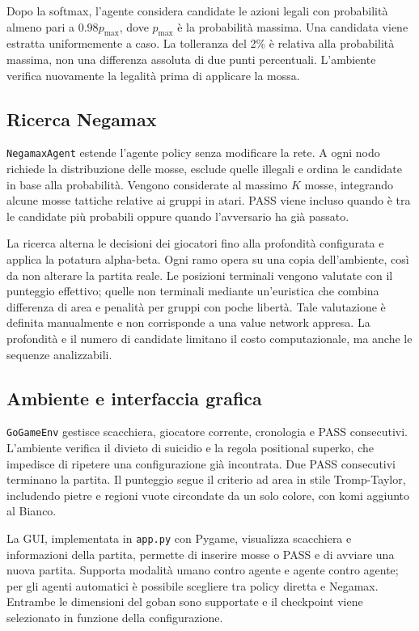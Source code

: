 Dopo la softmax, l'agente considera candidate le azioni legali con probabilità almeno pari a $0.98p_{\max}$, dove $p_{\max}$ è la probabilità massima. Una candidata viene estratta uniformemente a caso. La tolleranza del 2\% è relativa alla probabilità massima, non una differenza assoluta di due punti percentuali. L'ambiente verifica nuovamente la legalità prima di applicare la mossa.

\subsection{Ricerca Negamax}

\texttt{NegamaxAgent} estende l'agente policy senza modificare la rete. A ogni nodo richiede la distribuzione delle mosse, esclude quelle illegali e ordina le candidate in base alla probabilità. Vengono considerate al massimo $K$ mosse, integrando alcune mosse tattiche relative ai gruppi in atari. PASS viene incluso quando è tra le candidate più probabili oppure quando l'avversario ha già passato.

La ricerca alterna le decisioni dei giocatori fino alla profondità configurata e applica la potatura alpha-beta. Ogni ramo opera su una copia dell'ambiente, così da non alterare la partita reale. Le posizioni terminali vengono valutate con il punteggio effettivo; quelle non terminali mediante un'euristica che combina differenza di area e penalità per gruppi con poche libertà. Tale valutazione è definita manualmente e non corrisponde a una value network appresa. La profondità e il numero di candidate limitano il costo computazionale, ma anche le sequenze analizzabili.

\subsection{Ambiente e interfaccia grafica}

\texttt{GoGameEnv} gestisce scacchiera, giocatore corrente, cronologia e PASS consecutivi. L'ambiente verifica il divieto di suicidio e la regola positional superko, che impedisce di ripetere una configurazione già incontrata. Due PASS consecutivi terminano la partita. Il punteggio segue il criterio ad area in stile Tromp-Taylor, includendo pietre e regioni vuote circondate da un solo colore, con komi aggiunto al Bianco.

La GUI, implementata in \texttt{app.py} con Pygame, visualizza scacchiera e informazioni della partita, permette di inserire mosse o PASS e di avviare una nuova partita. Supporta modalità umano contro agente e agente contro agente; per gli agenti automatici è possibile scegliere tra policy diretta e Negamax. Entrambe le dimensioni del goban sono supportate e il checkpoint viene selezionato in funzione della configurazione.
